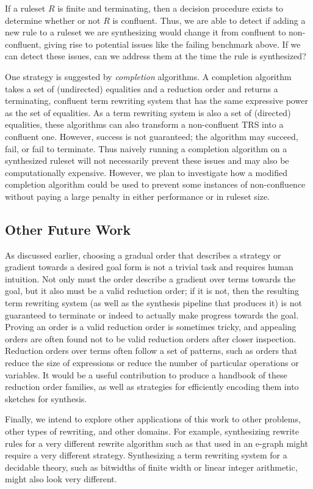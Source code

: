 If a ruleset $R$ is finite and terminating, then a decision procedure exists to determine whether or not $R$ is confluent. Thus, we are able to detect if adding a new rule to a ruleset we are synthesizing would change it from confluent to non-confluent, giving rise to potential issues like the failing benchmark above. If we can detect these issues, can we address them at the time the rule is synthesized?

One strategy is suggested by \emph{completion} algorithms. A completion algorithm takes a set of (undirected) equalities and a reduction order and returns a terminating, confluent term rewriting system that has the same expressive power as the set of equalities. As a term rewriting system is also a set of (directed) equalities, these algorithms can also transform a non-confluent TRS into a confluent one. However, success is not guaranteed; the algorithm may succeed, fail, or fail to terminate. Thus naively running a completion algorithm on a synthesized ruleset will not necessarily prevent these issues and may also be computationally expensive. However, we plan to investigate how a modified completion algorithm could be used to prevent some instances of non-confluence without paying a large penalty in either performance or in ruleset size.

\subsection{Other Future Work}

As discussed earlier, choosing a gradual order that describes a strategy or gradient towards a desired goal form is not a trivial task and requires human intuition. Not only must the order describe a gradient over terms towards the goal, but it also must be a valid reduction order; if it is not, then the resulting term rewriting system (as well as the synthesis pipeline that produces it) is not guaranteed to terminate or indeed to actually make progress towards the goal. Proving an order is a valid reduction order is sometimes tricky, and appealing orders are often found not to be valid reduction orders after closer inspection. Reduction orders over terms often follow a set of patterns, such as orders that reduce the size of expressions or reduce the number of particular operations or variables. It would be a useful contribution to produce a handbook of these reduction order families, as well as strategies for efficiently encoding them into sketches for synthesis.

Finally, we intend to explore other applications of this work to other problems, other types of rewriting, and other domains. For example, synthesizing rewrite rules for a very different rewrite algorithm such as that used in an e-graph might require a very different strategy. Synthesizing a term rewriting system for a decidable theory, such as bitwidths of finite width or linear integer arithmetic, might also look very different.

